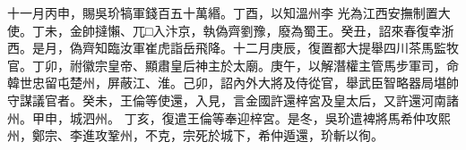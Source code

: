 \begin{pinyinscope}
 十一月丙申，賜吳玠犒軍錢百五十萬緡。丁酉，以知溫州李
 光為江西安撫制置大使。丁未，金帥撻懶、兀□入汴京，執偽齊劉豫，廢為蜀王。癸丑，詔來春復幸浙西。是月，偽齊知臨汝軍崔虎詣岳飛降。十二月庚辰，復置都大提舉四川茶馬監牧官。丁卯，祔徽宗皇帝、顯肅皇后神主於太廟。庚午，以解潛權主管馬步軍司，命韓世忠留屯楚州，屏蔽江、淮。己卯，詔內外大將及侍從官，舉武臣智略器局堪帥守謀議官者。癸未，王倫等使還，入見，言金國許還梓宮及皇太后，又許還河南諸州。甲申，城泗州。
 丁亥，復遣王倫等奉迎梓宮。是冬，吳玠遣裨將馬希仲攻熙州，鄭宗、李進攻鞏州，不克，宗死於城下，希仲遁還，玠斬以徇。



\end{pinyinscope}